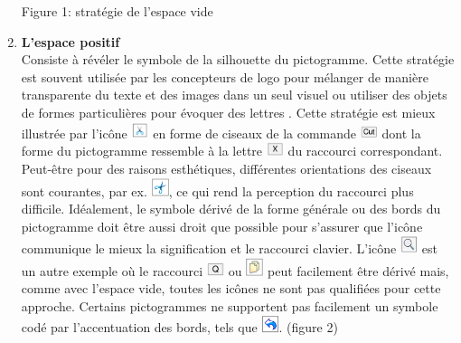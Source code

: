\documentclass[12pt,a4paper]{article}
\begin{document}
\begin{enumerate}
\begin{center}
	Figure 1: stratégie de l’espace vide
\end{center}
\item {\large \textbf{L’espace positif}}\\
Consiste à révéler le symbole de la silhouette du pictogramme. Cette stratégie est souvent utilisée par les concepteurs de logo pour mélanger de manière transparente du texte et des images dans un seul visuel ou utiliser des objets de formes particulières pour évoquer des lettres \cite{18}. Cette stratégie est mieux illustrée par l'icône \includegraphics[width=0.04\textwidth]{i7.png} en forme de ciseaux de la commande \includegraphics[width=0.04\textwidth]{i8.png} dont la forme du
pictogramme ressemble à la lettre \includegraphics[width=0.04\textwidth]{i9.png} du raccourci correspondant. Peut-être pour des raisons esthétiques, différentes orientations des ciseaux sont courantes, par ex. \includegraphics[width=0.04\textwidth]{i10.png}, ce qui rend la perception
du raccourci plus difficile. Idéalement, le symbole dérivé de la forme générale ou des  bords du pictogramme doit être aussi droit que possible pour s'assurer que l'icône communique le mieux la signification et le raccourci clavier. L'icône \includegraphics[width=0.04\textwidth]{i11.png} est un autre exemple où le raccourci \includegraphics[width=0.04\textwidth]{i12.png} ou \includegraphics[width=0.04\textwidth]{i3.png} peut facilement être dérivé mais, comme avec l'espace vide, toutes les icônes ne sont pas qualifiées pour cette approche. Certains pictogrammes ne supportent pas facilement un symbole codé par l'accentuation des bords, tels que \includegraphics[width=0.04\textwidth]{i14.png}. (figure 2)

\end{enumerate}
\end{document}
